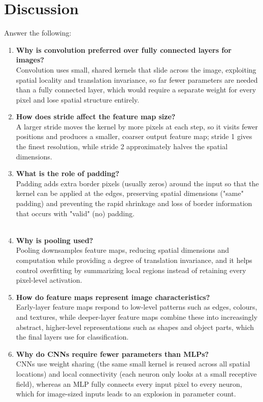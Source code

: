 \documentclass[11pt]{article}
\begin{document}
\section{Discussion}
Answer the following: 
\begin{enumerate}
    \item \textbf{Why is convolution preferred over fully connected layers for images?} \\
    Convolution uses small, shared kernels that slide across the image, exploiting spatial locality and translation invariance, so far fewer parameters are needed than a fully connected layer, which would require a separate weight for every pixel and lose spatial structure entirely.\\

    \item \textbf{How does stride affect the feature map size?} \\
    A larger stride moves the kernel by more pixels at each step, so it visits fewer positions and produces a smaller, coarser output feature map; stride 1 gives the finest resolution, while stride 2 approximately halves the spatial dimensions.\\

    \item \textbf{What is the role of padding?} \\
    Padding adds extra border pixels (usually zeros) around the input so that the kernel can be applied at the edges, preserving spatial dimensions ("same" padding) and preventing the rapid shrinkage and loss of border information that occurs with "valid" (no) padding.\\\\

    \item \textbf{Why is pooling used?} \\
    Pooling downsamples feature maps, reducing spatial dimensions and computation while providing a degree of translation invariance, and it helps control overfitting by summarizing local regions instead of retaining every pixel-level activation.\\

    \item \textbf{How do feature maps represent image characteristics?} \\
    Early-layer feature maps respond to low-level patterns such as edges, colours, and textures, while deeper-layer feature maps combine these into increasingly abstract, higher-level representations such as shapes and object parts, which the final layers use for classification.\\

    \item \textbf{Why do CNNs require fewer parameters than MLPs?} \\
    CNNs use weight sharing (the same small kernel is reused across all spatial locations) and local connectivity (each neuron only looks at a small receptive field), whereas an MLP fully connects every input pixel to every neuron, which for image-sized inputs leads to an explosion in parameter count.
\end{enumerate}
\end{document}
